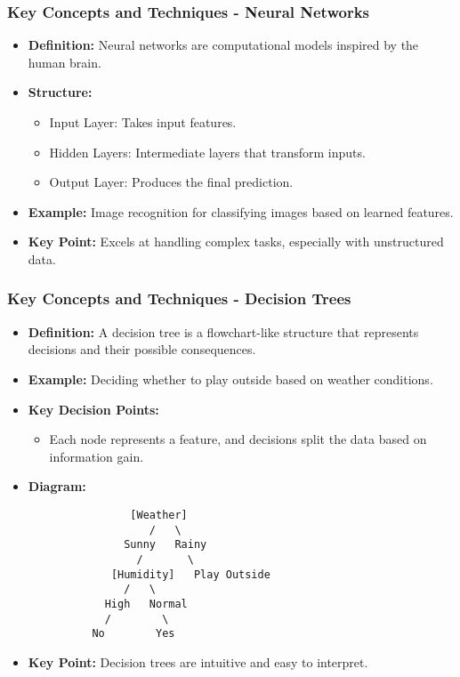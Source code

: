 \documentclass{beamer}
\begin{document}
\begin{frame}[fragile]
    \frametitle{Key Concepts and Techniques - Neural Networks}
    \begin{itemize}
        \item \textbf{Definition:} Neural networks are computational models inspired by the human brain.
        
        \item \textbf{Structure:}
        \begin{itemize}
            \item Input Layer: Takes input features.
            \item Hidden Layers: Intermediate layers that transform inputs.
            \item Output Layer: Produces the final prediction.
        \end{itemize}
        
        \item \textbf{Example:} Image recognition for classifying images based on learned features.
        
        \item \textbf{Key Point:} Excels at handling complex tasks, especially with unstructured data.
    \end{itemize}
\end{frame}

\begin{frame}[fragile]
    \frametitle{Key Concepts and Techniques - Decision Trees}
    \begin{itemize}
        \item \textbf{Definition:} A decision tree is a flowchart-like structure that represents decisions and their possible consequences.
        
        \item \textbf{Example:} Deciding whether to play outside based on weather conditions.
        
        \item \textbf{Key Decision Points:}
        \begin{itemize}
            \item Each node represents a feature, and decisions split the data based on information gain.
        \end{itemize}
        
        \item \textbf{Diagram:}
        \begin{verbatim}
                [Weather]
                   /   \
               Sunny   Rainy
                 /       \
             [Humidity]   Play Outside
               /   \
            High   Normal
            /        \
          No        Yes
        \end{verbatim}
        
        \item \textbf{Key Point:} Decision trees are intuitive and easy to interpret.
    \end{itemize}
\end{frame}
\end{document}
